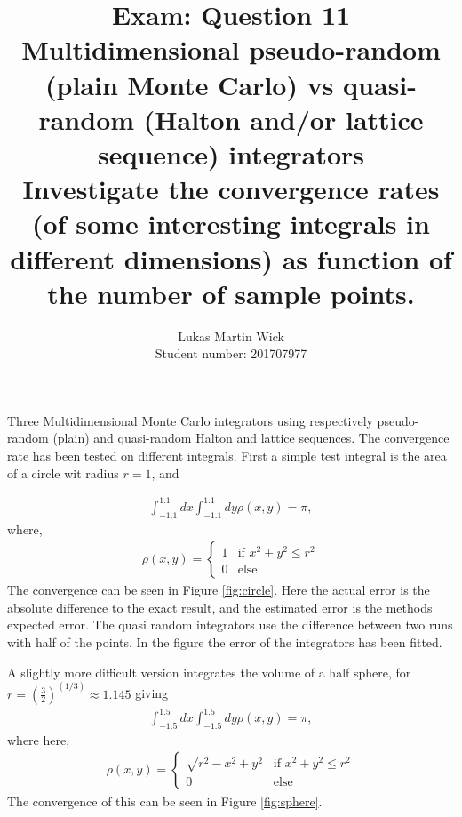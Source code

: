 \documentclass[onecolumn]{article}
\title{Exam: Question 11 \\ \large \textbf{Multidimensional pseudo-random (plain Monte Carlo) vs
quasi-random (Halton and/or lattice sequence) integrators}\\
Investigate the convergence rates (of some interesting integrals in
different dimensions) as function of the number of sample points.}
\author{Lukas Martin Wick\\
Student number: 201707977}
\begin{document}
\maketitle
Three Multidimensional Monte Carlo integrators using respectively pseudo-random (plain) and quasi-random Halton and lattice sequences. 
The convergence rate has been tested on different integrals. First a simple test integral is the area of a circle wit radius $r = 1$, and

\begin{align}
   \int^{1.1}_{-1.1} dx \int^{1.1}_{-1.1} dy \rho(x,y) = \pi,
\end{align}
where, 
\begin{align}
\rho(x,y) =
\begin{cases}
    1 & \text{if } x^2+y^2\leq r^2  \\
    0 & \text{else }      %
\end{cases}
\end{align}
The convergence can be seen in Figure \ref{fig:circle}. Here the actual error is the absolute
difference to the exact result, and the estimated error is the methods expected
error. The quasi random integrators use the difference between two runs with
half of the points. In the figure the error of the integrators has been fitted.

A slightly more difficult version integrates the volume of a half sphere, for $r=\left(\frac{3}{2}\right)^(1/3)\approx 1.145$ giving
\begin{align}
    \int^{1.5}_{-1.5} dx \int^{1.5}_{-1.5} dy \rho(x,y) = \pi,
 \end{align}
 where here, 
 \begin{align}
 \rho(x,y) =
 \begin{cases}
     \sqrt{r^2-x^2+y^2} & \text{if } x^2+y^2\leq r^2  \\
     0 & \text{else }      %
 \end{cases}
\end{align}
The convergence of this can be seen in Figure \ref{fig:sphere}.
\end{document}
